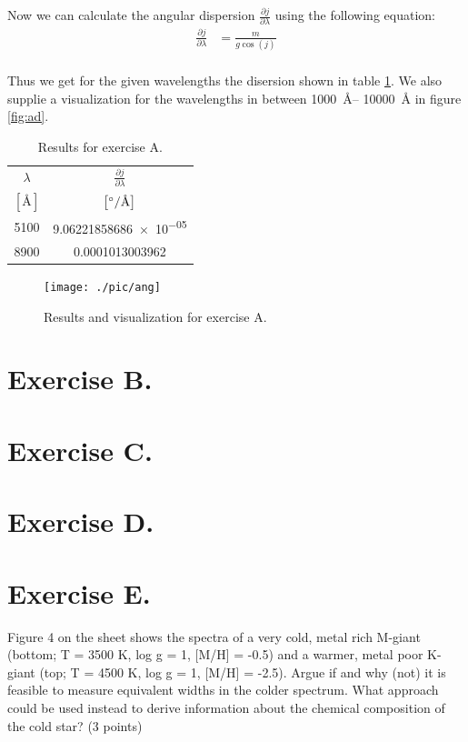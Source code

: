 \documentclass[11pt,a4paper,twoside]{article}
\begin{document}
Now we can calculate the angular dispersion $\frac{\partial j}{\partial\lambda}$ 
using the following equation:
\begin{align}
    \frac{\partial j}{\partial \lambda} &= \frac{m}{g\cos(j)}    \\
\end{align}

Thus we get for the given wavelengths the disersion shown in table \ref{tab:ad}.
We also supplie a visualization for the wavelengths in between \SIrange{1000}{
10000}{\angstrom} in figure \ref{fig:ad}.
\begin{table}[h!]
\centering
\begin{tabular}{cc}\toprule
    $\lambda$   & $\frac{\partial j}{\partial \lambda}$  \\
    $\left[\si{\angstrom}\right]$ 
                & $\left[\si[per-mode=symbol]{\degree\per\angstrom}\right]$ \\
    \midrule
    5100        &   \num[round-mode=places, round-precision=4]{9.06221858686e-05} \\
    8900        &   \num[round-mode=places, round-precision=4]{0.0001013003962}   \\
\bottomrule
\end{tabular}
\caption{Results for exercise A.}
\label{tab:ad}
\end{table}

\begin{figure}
\centering
\texttt{[image: ./pic/ang]}
\caption{Results and visualization for exercise A.}
\end{figure}

\section*{Exercise B.}
\section*{Exercise C.}
\section*{Exercise D.}
\section*{Exercise E.}

Figure 4 on the sheet shows the spectra of a very cold, metal rich M-giant 
(bottom; T = 3500 K, log g = 1, [M/H] = -0.5) and a warmer, metal poor K-giant 
(top; T = 4500 K, log g = 1, [M/H] = -2.5). Argue if and why (not) it is 
feasible to measure equivalent widths in the colder spectrum. What approach 
could be used instead to derive information about the chemical composition of 
the cold star? (3 points)
\newline
\end{document}
